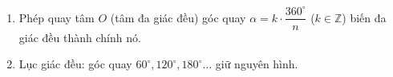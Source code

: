 \begin{enumerate}
\item Phép quay tâm $O$ (tâm đa giác đều) góc quay $\alpha = k \cdot \dfrac{360^\circ}{n}$ ($k \in \mathbb{Z}$) biến đa giác đều thành chính nó.
\item Lục giác đều: góc quay $60^\circ, 120^\circ, 180^\circ\dots$ giữ nguyên hình.
\end{enumerate}
